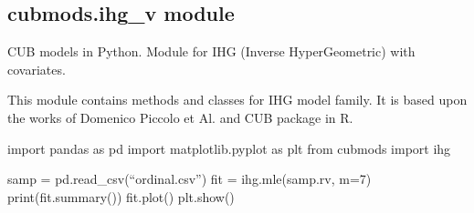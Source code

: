 \documentclass[letterpaper,10pt,english]{sphinxmanual}
\begin{document}
\subsection{cubmods.ihg\_v module}
\label{\detokenize{cubmods:module-cubmods.ihg_v}}\label{\detokenize{cubmods:cubmods-ihg-v-module}}
\sphinxAtStartPar
CUB models in Python.
Module for IHG (Inverse HyperGeometric) with covariates.
\begin{description}
\sphinxAtStartPar
This module contains methods and classes
for IHG model family.
It is based upon the works of Domenico
Piccolo et Al. and CUB package in R.

\sphinxAtStartPar
import pandas as pd
import matplotlib.pyplot as plt
from cubmods import ihg

\sphinxAtStartPar
samp = pd.read\_csv(“ordinal.csv”)
fit = ihg.mle(samp.rv, m=7)
print(fit.summary())
fit.plot()
plt.show()

\end{description}
\end{document}
